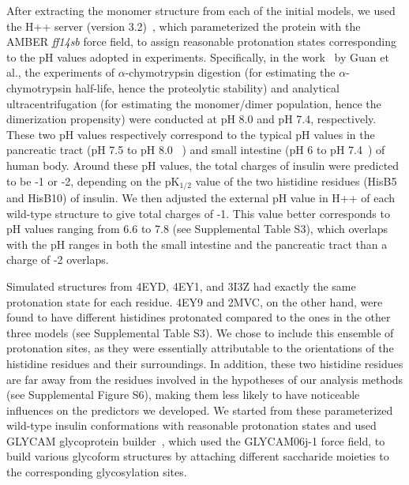 \documentclass[sn-vancouver]{sn-jnl}
\begin{document}
After extracting the monomer structure from each of the initial models, we used the H++ server (version 3.2)~\cite{anandakrishnan2012h++, myers2006simple, gordon2005h++}, which parameterized the protein with the AMBER \textit{ff14sb} force field, to assign reasonable protonation states corresponding to the pH values adopted in experiments. Specifically, in the work~\cite{guan2018chemically} by Guan et al., the experiments of $\alpha$-chymotrypsin digestion (for estimating the $\alpha$-chymotrypsin half-life, hence the proteolytic stability) and analytical ultracentrifugation (for estimating the monomer/dimer population, hence the dimerization propensity) were conducted at pH 8.0 and pH 7.4, respectively. These two pH values respectively correspond to the typical pH values in the pancreatic tract (pH 7.5 to pH 8.0 ~\cite{mcqueen2017comprehensive}) and small intestine (pH 6 to pH 7.4~\cite{fallingborg1999intraluminal}) of human body. Around these pH values, the total charges of insulin were predicted to be -1 or -2,  depending on the pK$_{1/2}$ value of the two histidine residues (HisB5 and HisB10) of insulin. We then adjusted the external pH value in H++ of each wild-type structure to give total charges of -1. This value better corresponds to pH values ranging from 6.6 to 7.8 (see Supplemental Table S3), which overlaps with the pH ranges in both the small intestine and the pancreatic tract than a charge of -2 overlaps. 

Simulated structures from 4EYD, 4EY1, and 3I3Z had exactly the same protonation state for each residue. 4EY9 and 2MVC, on the other hand, were found to have different histidines protonated compared to the ones in the other three models (see Supplemental Table S3).  We chose to include this ensemble of protonation sites, as they were essentially attributable to the orientations of the histidine residues and their surroundings. In addition, these two histidine residues are far away from the residues involved in the hypotheses of our analysis methods (see Supplemental Figure S6), making them less likely to have noticeable influences on the predictors we developed. We started from these parameterized wild-type insulin conformations with reasonable protonation states and used GLYCAM glycoprotein builder~\cite{kirschner2008glycam06}, which used the GLYCAM06j-1 force field, to build various glycoform structures by attaching different saccharide moieties to the corresponding glycosylation sites. 
\end{document}
